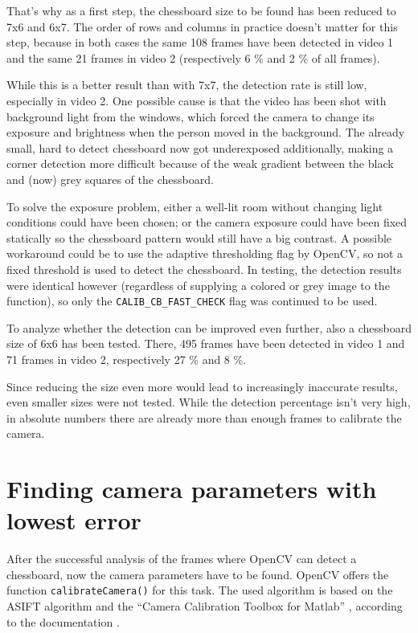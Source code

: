 That's why as a first step, the chessboard size to be found has been reduced to 7x6 and 6x7. The order of rows and columns in practice doesn't matter for this step, because in both cases the same 108 frames have been detected in video 1 and the same 21 frames in video 2 (respectively 6 \% and 2 \% of all frames).

While this is a better result than with 7x7, the detection rate is still low, especially in video 2. One possible cause is that the video has been shot with background light from the windows, which forced the camera to change its exposure and brightness when the person moved in the background. The already small, hard to detect chessboard now got underexposed additionally, making a corner detection more difficult because of the weak gradient between the black and (now) grey squares of the chessboard.

To solve the exposure problem, either a well-lit room without changing light conditions could have been chosen; or the camera exposure could have been fixed statically so the chessboard pattern would still have a big contrast. A possible workaround could be to use the adaptive thresholding flag by OpenCV, so not a fixed threshold is used to detect the chessboard. In testing, the detection results were identical however (regardless of supplying a colored or grey image to the function), so only the \texttt{CALIB\_CB\_FAST\_CHECK} flag was continued to be used.

To analyze whether the detection can be improved even further, also a chessboard size of 6x6 has been tested. There, 495 frames have been detected in video 1 and 71 frames in video 2, respectively 27 \% and 8 \%.

Since reducing the size even more would lead to increasingly inaccurate results, even smaller sizes were not tested. While the detection percentage isn't very high, in absolute numbers there are already more than enough frames to calibrate the camera.

\section{Finding camera parameters with lowest error}

After the successful analysis of the frames where OpenCV can detect a chessboard, now the camera parameters have to be found. OpenCV offers the function \texttt{calibrateCamera()} for this task. The used algorithm is based on the ASIFT algorithm \cite{ipol.2011.my-asift} and the \enquote{Camera Calibration Toolbox for Matlab} \cite{cc_toolbox}, according to the documentation \cite{cv_calibratecamera}.

